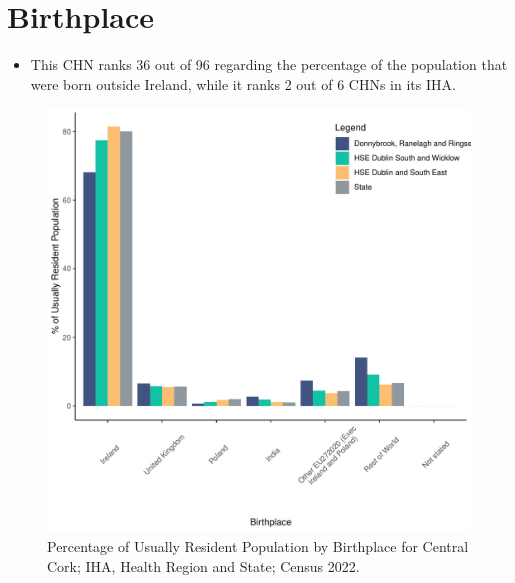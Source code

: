 \documentclass{article}
\begin{document}
\section{Birthplace}\label{sect:Birth}
\begin{itemize}
\item This CHN ranks  36 out of 96 regarding the percentage of the population that were born outside Ireland, while it ranks  2 out of 6 CHNs in its IHA.
\end{itemize}
\begin{figure}[H]
	\centering
	\includegraphics[width = 130mm]{../figures/BirthED.pdf}
	\caption{Percentage of Usually Resident Population by Birthplace for Central Cork; IHA, Health Region and State; Census 2022.}
	\label{fig:vbnv}
	\end{figure}
	
\end{document}
